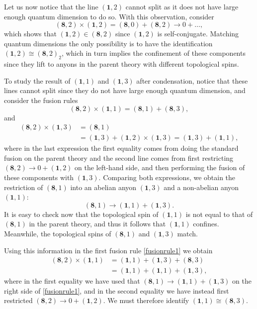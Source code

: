 \documentclass[11pt]{article}
\numberwithin{equation}{section}
\begin{document}
Let us now notice that the line $(\mathbf{1},2)$ cannot split as it does not have large enough quantum dimension to do so. With this observation, consider
\begin{equation}
    (\mathbf{8},2) \times (\mathbf{1},2) = (\mathbf{8},0) + (\mathbf{8},2) \longrightarrow 0 + \ldots,
\end{equation}
which shows that $(\mathbf{1},2) \in (\mathbf{8},2)$ since $(\mathbf{1},2)$ is self-conjugate. Matching quantum dimensions the only possibility is to have the identification $(\mathbf{1},2) \cong (\mathbf{8},2)_{2}$, which in turn implies the confinement of these components since they lift to anyons in the parent theory with different topological spins.

To study the result of $(\mathbf{1},1)$ and $(\mathbf{1},3)$ after condensation, notice that these lines cannot split since they do not have large enough quantum dimension, and consider the fusion rules
\begin{equation}
    (\mathbf{8},2) \times (\mathbf{1},1) = (\mathbf{8},1) + (\mathbf{8},3), \label{fusionrule1}
\end{equation}
and
\begin{align}
    (\mathbf{8},2) \times (\mathbf{1},3) &= (\mathbf{8},1) \\[0.3cm] &= (\mathbf{1},3) + (\mathbf{1},2) \times (\mathbf{1},3) =(\mathbf{1},3) + (\mathbf{1},1), \label{fusionrule2}
\end{align}
where in the last expression the first equality comes from doing the standard fusion on the parent theory and the second line comes from first restricting $(\mathbf{8},2) \to 0 + (\mathbf{1},2)$ on the left-hand side, and then performing the fusion of these components with $(\mathbf{1},3)$. Comparing both expressions, we obtain the restriction of $(\mathbf{8},1)$ into an abelian anyon $(\mathbf{1},3)$ and a non-abelian anyon $(\mathbf{1},1)$:
\begin{equation}
    (\mathbf{8},1) \longrightarrow (\mathbf{1},1) + (\mathbf{1},3).
\end{equation}
It is easy to check now that the topological spin of $(\mathbf{1},1)$ is not equal to that of $(\mathbf{8},1)$ in the parent theory, and thus it follows that $(\mathbf{1},1)$ confines. Meanwhile, the topological spins of $(\mathbf{8},1)$ and $(\mathbf{1},3)$ match.

Using this information in the first fusion rule \eqref{fusionrule1} we obtain
\begin{align}
    (\mathbf{8},2) \times (\mathbf{1},1) &= (\mathbf{1},1) + (\mathbf{1},3) + (\mathbf{8},3) \\[0.3cm] &= (\mathbf{1},1) + (\mathbf{1},1) + (\mathbf{1},3),
\end{align}
where in the first equality we have used that $(\mathbf{8},1) \to (\mathbf{1},1) + (\mathbf{1},3)$ on the right side of \eqref{fusionrule1}, and in the second equality we have instead first restricted $(\mathbf{8},2) \to 0 + (\mathbf{1},2)$. We must therefore identify $(\mathbf{1},1) \cong (\mathbf{8},3)$.
\end{document}
